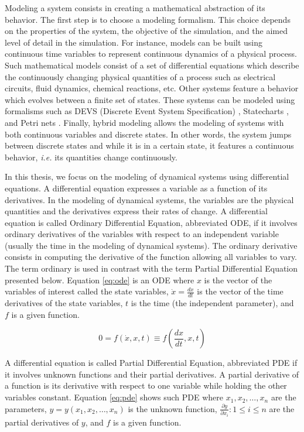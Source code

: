 Modeling a system consists in creating a mathematical abstraction of its behavior. The first step is to choose a modeling formalism. This choice depends on the properties of the system, the objective of the simulation, and the aimed level of detail in the simulation. For instance, models can be built using continuous time variables to represent continuous dynamics of a physical process. Such mathematical models consist of a set of differential equations which describe the continuously changing physical quantities of a process such as electrical circuits, fluid dynamics, chemical reactions, etc. Other systems feature a behavior which evolves between a finite set of states. These systems can be modeled using formalisms such as DEVS (Discrete Event System Specification) \cite{zeigler:2000}, Statecharts \cite{harel:1987}, and Petri nets \cite{petri:1962}. Finally, hybrid modeling allows the modeling of systems with both continuous variables and discrete states. In other words, the system jumps between discrete states and while it is in a certain state, it features a continuous behavior, {\em i.e.} its quantities change continuously. 

In this thesis, we focus on the modeling of dynamical systems using differential equations. A differential equation expresses a variable as a function of its derivatives. In the modeling of dynamical systems, the variables are the physical quantities and the derivatives express their rates of change. A differential equation is called Ordinary Differential Equation, abbreviated ODE, if it involves ordinary derivatives of the variables with respect to an independent variable (usually the time in the modeling of dynamical systems). The ordinary derivative consists in computing the derivative of the function allowing all variables to vary. The term ordinary is used in contrast with the term Partial Differential Equation presented below. Equation \ref{eq:ode} is an ODE where $x$ is the vector of the variables of interest called the state variables, $\dot{x} = \frac{dx}{dt}$ is the vector of the time derivatives of the state variables, $t$ is the time (the independent parameter), and $f$ is a given function.

\begin{equation}
 0 = f(\dot{x},x,t) \equiv f(\frac{dx}{dt},x,t)
\label{eq:ode}
\end{equation}

A differential equation is called Partial Differential Equation, abbreviated PDE if it involves unknown functions and their partial derivatives. A partial derivative of a function is its derivative with respect to one variable while holding the other variables constant. Equation \ref{eq:pde} shows such PDE where $x_1,x_2,\dots, x_n$ are the parameters, $y=y(x_1,x_2,\dots, x_n)$ is the unknown function, $\frac{\partial y}{\partial x_i}: 1 \leq i \leq n$ are the partial  derivatives of $y$, and $f$ is a given function.

